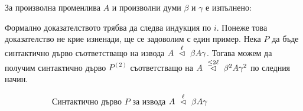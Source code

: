\begin{proposition}\label{pr:pumping:iteration}
  За произволна променлива $A$ и произволни думи $\beta$ и $\gamma$ е изпълнено:
  \begin{prooftree}
  \end{prooftree}
\end{proposition}
\begin{hint}
  Формално доказателството трябва да следва индукция по $i$.
  Понеже това доказателство не крие изненади, ще се задоволим с един пример. Нека $P$ да бъде синтактично дърво съответстващо на извода $A \yield{\ell} \beta A \gamma$.
  Тогава можем да получим синтактично дърво $P^{(2)}$  съответстващо на $A \yield{\leq 2\ell} \beta^2A\gamma^2$ по следния начин.
  \begin{figure}[H]
    \begin{subfigure}[t]{0.3\textwidth}
      \centering
      \caption{\scriptsize{Синтактично дърво $P$ за извода $A \yield{\ell} \beta A\gamma$}}
    \end{subfigure}
    ~
    \begin{subfigure}[t]{0.3\textwidth}
      \centering
\end{subfigure}
\end{figure}
\end{hint}
